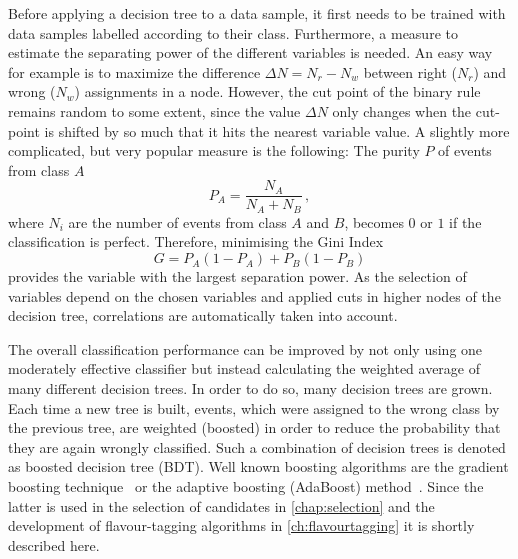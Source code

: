 Before applying a decision tree to a data sample, it first needs to be trained with data samples labelled according to their class.
Furthermore, a measure to estimate the separating power of the different variables is needed.
An easy way for example is to maximize the difference $\Delta N=N_r-N_w$ between right ($N_r$) and wrong ($N_w$) assignments in a node.
However, the cut point of the binary rule remains random to some extent, since the value $\Delta N$ only changes when the cut-point is shifted by so much that it hits the nearest variable value.
A slightly more complicated, but very popular measure is the following:
The purity $P$ of events from class $A$
\begin{equation}
P_A=\frac{N_A}{N_A+N_B}\,,
\end{equation}
where $N_i$ are the number of events from class $A$ and $B$, becomes $0$ or $1$ if the classification is perfect.
Therefore, minimising the Gini Index~\cite{Bohm:389738}
\begin{equation}
G=P_A\left(1-P_A\right)+P_B\left(1-P_B\right)
\end{equation}
provides the variable with the largest separation power.
As the selection of variables depend on the chosen variables and applied cuts in higher nodes of the decision tree, correlations are automatically taken into account.

The overall classification performance can be improved by not only using one moderately effective classifier but instead calculating the weighted average of many different decision trees.
In order to do so, many decision trees are grown.
Each time a new tree is built, events, which were assigned to the wrong class by the previous tree, are weighted (boosted) in order to reduce the probability that they are again wrongly classified.
Such a combination of decision trees is denoted as boosted decision tree (\ac{BDT}).
Well known boosting algorithms are the gradient boosting technique~\cite{gradientBoost} or the adaptive boosting (AdaBoost) method~\cite{AdaBoost}.
Since the latter is used in the selection of \BdToDpi candidates in \cref{chap:selection} and the development of flavour-tagging algorithms in \cref{ch:flavourtagging} it is shortly described here.


